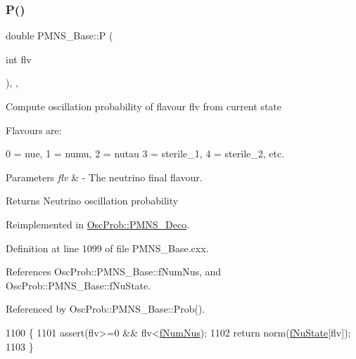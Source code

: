 \subsubsection{\texorpdfstring{P()}{P()}}
{\footnotesize\ttfamily double P\+M\+N\+S\+\_\+\+Base\+::P (\begin{DoxyParamCaption}\item[{int}]{flv }\end{DoxyParamCaption})\hspace{0.3cm}{\ttfamily [protected]}, {\ttfamily [virtual]}, {\ttfamily [inherited]}}

Compute oscillation probability of flavour flv from current state

Flavours are\+: 
\begin{DoxyPre}
  0 = nue, 1 = numu, 2 = nutau
  3 = sterile\_1, 4 = sterile\_2, etc.
\end{DoxyPre}
 
\begin{DoxyParams}{Parameters}
{\em flv} & -\/ The neutrino final flavour.\\
\hline
\end{DoxyParams}
\begin{DoxyReturn}{Returns}
Neutrino oscillation probability 
\end{DoxyReturn}


Reimplemented in \hyperlink{classOscProb_1_1PMNS__Deco_aa81f47ea36207b90a5feb9849060032d}{Osc\+Prob\+::\+P\+M\+N\+S\+\_\+\+Deco}.



Definition at line 1099 of file P\+M\+N\+S\+\_\+\+Base.\+cxx.



References Osc\+Prob\+::\+P\+M\+N\+S\+\_\+\+Base\+::f\+Num\+Nus, and Osc\+Prob\+::\+P\+M\+N\+S\+\_\+\+Base\+::f\+Nu\+State.



Referenced by Osc\+Prob\+::\+P\+M\+N\+S\+\_\+\+Base\+::\+Prob().


\begin{DoxyCode}
1100 \{
1101   assert(flv>=0 && flv<\hyperlink{classOscProb_1_1PMNS__Base_a24bb74bed63569dfe88b18fa6a08060e}{fNumNus});
1102   \textcolor{keywordflow}{return} norm(\hyperlink{classOscProb_1_1PMNS__Base_abf99f2339e3ee989600740b5d88063e8}{fNuState}[flv]);
1103 \}
\end{DoxyCode}
\mbox{\label{classOscProb_1_1PMNS__Base_a63f6450914b2ef712fbdc45787d9a27f}} 

